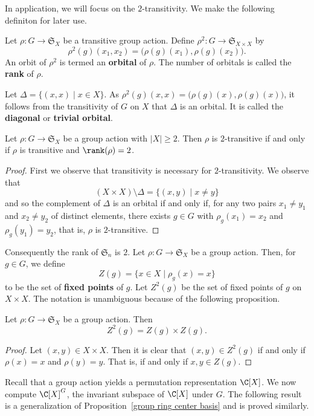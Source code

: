 In application, we will focus on the $2$-transitivity. We make the following definiton for later use.
\begin{definition}
Let $\rho:G\to\mathfrak{S}_{X}$ be a transitive group action. Define $\rho^2:G\to\mathfrak{S}_{X\times X}$ by
\[\rho^2(g)(x_1,x_2)=\big(\rho(g)(x_1),\rho(g)(x_2)\big).\]
An orbit of $\rho^2$ is termed an \textbf{orbital} of $\rho$. The number of orbitals is called the \textbf{rank} of $\rho$.
\end{definition}
Let $\Delta=\{(x,x)\mid x\in X\}$. As $\rho^2(g)(x,x)=\big(\rho(g)(x),\rho(g)(x)\big)$, it follows from the transitivity of $G$ on $X$ that $\Delta$ is an orbital. It is called the \textbf{diagonal} or \textbf{trivial orbital}.
\begin{proposition}
Let $\rho:G\to\mathfrak{S}_X$ be a group action with $|X|\geq 2$. Then $\rho$ is $2$-transitive if and only if $\rho$ is transitive and $\rank(\rho)=2$.
\end{proposition}
\begin{proof}
First we observe that transitivity is necessary for $2$-transitivity. We observe that
\[(X\times X)\setminus\Delta=\{(x,y)\mid x\neq y\}\]
and so the complement of $\Delta$ is an orbital if and only if, for any two pairs $x_1\neq y_1$ and $x_2\neq y_2$ of distinct elements, there exists $g\in G$ with $\rho_g(x_1)=x_2$ and $\rho_g(y_1)=y_2$, that is, $\rho$ is $2$-transitive.
\end{proof}
Consequently the rank of $\mathfrak{S}_n$ is $2$. Let $\rho:G\to\mathfrak{S}_X$ be a group action. Then, for $g\in G$, we define
\[Z(g)=\{x\in X\mid \rho_g(x)=x\}\]
to be the set of \textbf{fixed points} of $g$. Let $Z^2(g)$ be the set of fixed points of $g$ on $X\times X$. The notation is unambiguous because of the following proposition.
\begin{proposition}\label{group action fixed point product}
Let $\rho:G\to\mathfrak{S}_X$ be a group action. Then
\[Z^2(g)=Z(g)\times Z(g).\]
\end{proposition}
\begin{proof}
Let $(x,y)\in X\times X$. Then it is clear that $(x,y)\in Z^2(g)$ if and only if $\rho(x)=x$ and $\rho(y)=y$. That is, if and only if $x,y\in Z(g)$.
\end{proof}
Recall that a group action yields a permutation representation $\C[X]$. We now compute $\C[X]^G$, the invariant subspace of $\C[X]$ under $G$. The following result is a generalization of Proposition~\ref{group ring center basis} and is proved similarly.
